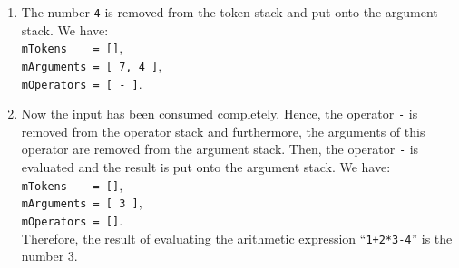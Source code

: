 \begin{enumerate}
\item The number \texttt{4} is removed from the token stack and put onto the argument stack. We have: \\[0.2cm]
      \hspace*{1.3cm} \texttt{mTokens \ \ \ = []}, \\[0.2cm]
      \hspace*{1.3cm} \texttt{mArguments = [ 7, 4 ]}, \\[0.2cm]
      \hspace*{1.3cm} \texttt{mOperators = [ - ]}. 
\item Now the input has been consumed completely.
      Hence, the operator \texttt{-} is removed from the  operator stack and
      furthermore, the arguments of this operator are removed from the argument stack.  Then, the
      operator \texttt{-} is evaluated and the result is put onto the argument
      stack.  We have: \\[0.2cm]
      \hspace*{1.3cm} \texttt{mTokens \ \ \ = []}, \\[0.2cm]
      \hspace*{1.3cm} \texttt{mArguments = [ 3 ]}, \\[0.2cm]
      \hspace*{1.3cm} \texttt{mOperators = []}. \\[0.2cm]
      Therefore, the result of evaluating the arithmetic expression ``\texttt{1+2*3-4}'' is the
      number 3.
\end{enumerate}

